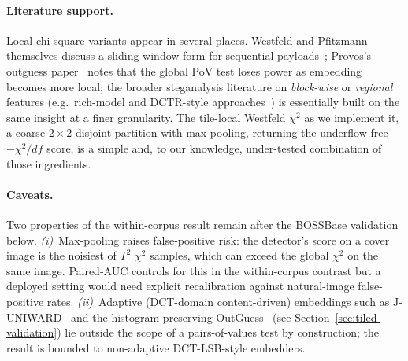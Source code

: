 \documentclass[10pt,twocolumn,a4paper]{article}
\begin{document}
\paragraph{Literature support.} Local chi-square variants appear in several places. Westfeld and Pfitzmann themselves discuss a sliding-window form for sequential payloads~\cite{westfeld1999chi}; Provos's outguess paper~\cite{provos2001outguess} notes that the global PoV test loses power as embedding becomes more local; the broader steganalysis literature on \emph{block-wise} or \emph{regional} features (e.g.\ rich-model and DCTR-style approaches~\cite{fridrich2012srm,holub2015dctr}) is essentially built on the same insight at a finer granularity. The tile-local Westfeld $\chi^2$ as we implement it, a coarse $2\!\times\!2$ disjoint partition with max-pooling, returning the underflow-free $-\chi^2/df$ score, is a simple and, to our knowledge, under-tested combination of those ingredients.

\paragraph{Caveats.} Two properties of the within-corpus result remain after the BOSSBase validation below.  \textit{(i)}~Max-pooling raises false-positive risk: the detector's score on a cover image is the noisiest of $T^2$ $\chi^2$ samples, which can exceed the global $\chi^2$ on the same image.  Paired-AUC controls for this in the within-corpus contrast but a deployed setting would need explicit recalibration against natural-image false-positive rates.  \textit{(ii)}~Adaptive (DCT-domain content-driven) embeddings such as J-UNIWARD~\cite{holub2014uniward} and the histogram-preserving OutGuess~\cite{provos2001outguess} (see Section~\ref{sec:tiled-validation}) lie outside the scope of a pairs-of-values test by construction; the result is bounded to non-adaptive DCT-LSB-style embedders.
\end{document}
